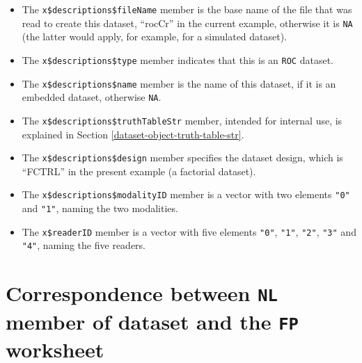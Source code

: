 \documentclass[
]{book}
\providecommand{\tightlist}{%
  \setlength{\itemsep}{0pt}\setlength{\parskip}{0pt}}
\begin{document}
\begin{itemize}
  \begin{itemize}
  \tightlist
  \item
    The \texttt{x\$descriptions\$fileName} member is the base name of the file that was read to create this dataset, ``rocCr'' in the current example, otherwise it is \texttt{NA} (the latter would apply, for example, for a simulated dataset).
  \item
    The \texttt{x\$descriptions\$type} member indicates that this is an \texttt{ROC} dataset.
  \item
    The \texttt{x\$descriptions\$name} member is the name of this dataset, if it is an embedded dataset, otherwise \texttt{NA}.
  \item
    The \texttt{x\$descriptions\$truthTableStr} member, intended for internal use, is explained in Section \ref{dataset-object-truth-table-str}.
  \item
    The \texttt{x\$descriptions\$design} member specifies the dataset design, which is ``FCTRL'' in the present example (a factorial dataset).
  \item
    The \texttt{x\$descriptions\$modalityID} member is a vector with two elements \texttt{"0"} and \texttt{"1"}, naming the two modalities.
  \item
    The \texttt{x\$readerID} member is a vector with five elements \texttt{"0"}, \texttt{"1"}, \texttt{"2"}, \texttt{"3"} and \texttt{"4"}, naming the five readers.
  \end{itemize}
\end{itemize}

\hypertarget{quick-start-read-datafile-correspondence-nl-fp}{%
\section{\texorpdfstring{Correspondence between \texttt{NL} member of dataset and the \texttt{FP} worksheet}{Correspondence between NL member of dataset and the FP worksheet}}\label{quick-start-read-datafile-correspondence-nl-fp}}
\end{document}
